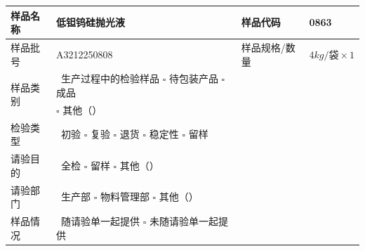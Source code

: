 \documentclass[UTF8,10pt,a4paper,fontset=fandol]{ctexart}
\renewcommand{\arraystretch}{1.15}
\newcommand{\fieldvalue}[1]{#1}
\newcommand{\handwritten}[1]{#1}
\begin{document}
\renewcommand{\arraystretch}{1.45}
\small
\begin{tabularx}{\textwidth}{|p{2.4cm}|X|p{2.8cm}|X|}
\hline
样品名称 &
\fieldvalue{\handwritten{低钽钨硅抛光液}} &
样品代码 &
\fieldvalue{\handwritten{0863}}
\\ \hline

样品批号 &
\fieldvalue{\handwritten{A3212250808}} &
样品规格/数量 &
$\fieldvalue{\handwritten{4kg/袋\times 1}}$
\\ \hline

\multirow{2}{*}{样品类别} &
\fieldvalue{\checkmark\ 生产过程中的检验样品}
\quad $\square$ 待包装产品
\quad $\square$ 成品
&
\multicolumn{1}{l|}{}
\\[-0.2em]
&
$\square$ 其他（\hspace{2em}）
&
\multicolumn{1}{l|}{}
\\ \hline

检验类型 &
\fieldvalue{\checkmark\ 初验}
\quad $\square$ 复验
\quad $\square$ 退货
\quad $\square$ 稳定性
\quad $\square$ 留样
&
\multicolumn{1}{l|}{}
\\ \hline

请验目的 &
\fieldvalue{\checkmark\ 全检}
\quad $\square$ 留样
\quad $\square$ 其他（\hspace{2em}）
&
\multicolumn{1}{l|}{}
\\ \hline

请验部门 &
\fieldvalue{\checkmark\ 生产部}
\quad $\square$ 物料管理部
\quad $\square$ 其他（\hspace{2em}）
&
\multicolumn{1}{l|}{}
\\ \hline

样品情况 &
\fieldvalue{\checkmark\ 随请验单一起提供}
\quad $\square$ 未随请验单一起提供
&
\multicolumn{1}{l|}{}
\\ \hline


\end{tabularx}
\end{document}
